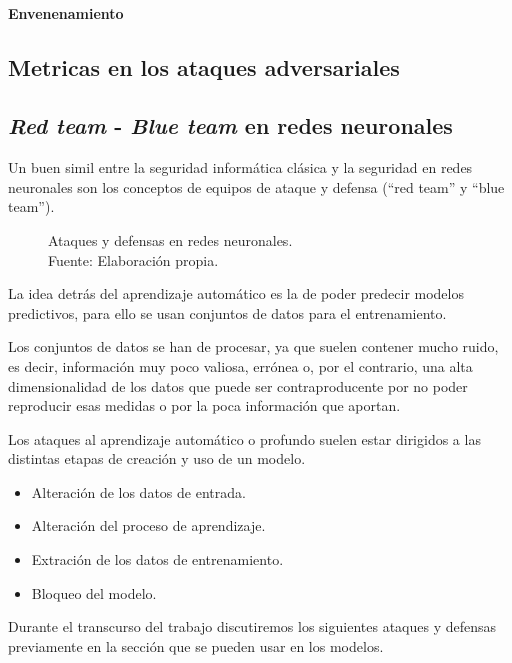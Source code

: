\paragraph{Envenenamiento}

\subsection{Metricas en los ataques adversariales}

\subsection{\textit{Red team} - \textit{Blue team} en redes neuronales}

Un buen simil entre la seguridad informática clásica y la seguridad en redes neuronales son los conceptos de equipos de ataque y defensa (``red team'' y ``blue team'').

\begin{figure}[H]
    \centering
    \centerline{}
    \caption{Ataques y defensas en redes neuronales.\\Fuente: Elaboración propia.}
    \label{fig:art-for-red-and-blue-teams}
\end{figure}

La idea detrás del aprendizaje automático es la de poder predecir modelos predictivos, para ello se usan conjuntos de datos para el entrenamiento.

Los conjuntos de datos se han de procesar, ya que suelen contener mucho ruido, es decir, información muy poco valiosa, errónea o, por el contrario, una alta dimensionalidad de los datos que puede ser contraproducente por no poder reproducir esas medidas o por la poca información que aportan.

Los ataques al aprendizaje automático o profundo suelen estar dirigidos a las distintas etapas de creación y uso de un modelo.

\begin{itemize}
    \item Alteración de los datos de entrada.
    \item Alteración del proceso de aprendizaje.
    \item Extración de los datos de entrenamiento.
    \item Bloqueo del modelo.
\end{itemize}

Durante el transcurso del trabajo discutiremos los siguientes ataques y defensas previamente en la sección  que se pueden usar en los modelos.

